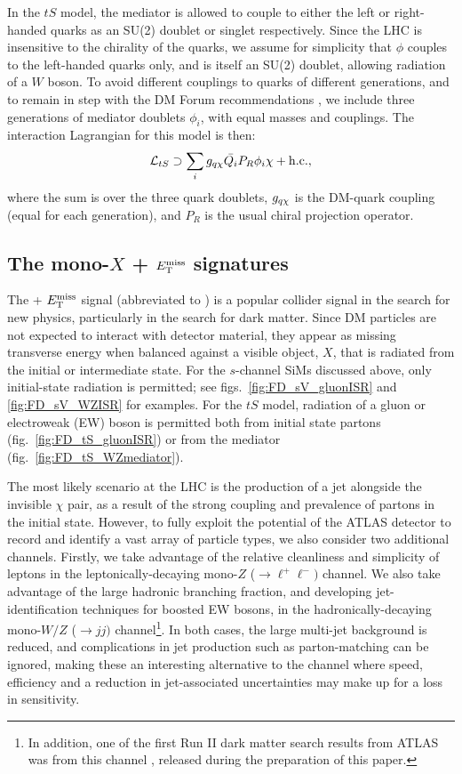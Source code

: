 In the $tS$ model, the mediator is allowed to couple to either the left or right-handed quarks as an SU(2) doublet or singlet respectively. Since the LHC is insensitive to the chirality of the quarks, we assume for simplicity that $\phi$ couples to the left-handed quarks only, and is itself an SU(2) doublet, allowing radiation of a $W$ boson. To avoid different couplings to quarks of different generations, and to remain in step with the DM Forum recommendations \cite{DMForumReport}, we include three generations of mediator doublets $\phi_i$, with equal masses and couplings. The interaction Lagrangian for this model is then:
\begin{equation}
\label{L_int_tS}
\mathcal{L}_{tS} \supset \sum_{i} g_{q \chi} \bar{Q_i} P_R \phi_i \chi + {\rm h.c.},
\end{equation}
where the sum is over the three quark doublets, $g_{q \chi}$ is the DM-quark coupling (equal for each generation), and $P_R$ is the usual chiral projection operator.

\subsection{The mono-$X$ + $E_{\mathrm{T}}^{\mathrm{miss}}$ signatures}
The \monoX + $E_{\mathrm{T}}^{\mathrm{miss}}$ signal (abbreviated to \monoXnospace) is a popular collider signal in the search for new physics, particularly in the search for dark matter. Since DM particles are not expected to interact with detector material, they appear as missing transverse energy when balanced against a visible object, $X$, that is radiated from the initial or intermediate state. For the $s$-channel SiMs discussed above, only initial-state radiation is permitted; see figs.~\ref{fig:FD_sV_gluonISR} and \ref{fig:FD_sV_WZISR} for examples. For the $tS$ model, radiation of a gluon or electroweak (EW) boson is permitted both from initial state partons (fig.~\ref{fig:FD_tS_gluonISR}) or from the mediator (fig.~\ref{fig:FD_tS_WZmediator}).

The most likely scenario at the LHC is the production of a jet alongside the invisible $\chi$ pair, as a result of the strong coupling and prevalence of partons in the initial state. However, to fully exploit the potential of the ATLAS detector to record and identify a vast array of particle types, we also consider two additional channels. Firstly, we take advantage of the relative cleanliness and simplicity of leptons in the leptonically-decaying mono-$Z$ ($\rightarrow \ell^+ \ell^-)$ channel. We also take advantage of the large hadronic branching fraction, and developing jet-identification techniques for boosted EW bosons, in the hadronically-decaying mono-$W/Z$ ($\rightarrow jj)$ channel\footnote{In addition, one of the first Run II dark matter search results from ATLAS was from this channel \cite{monoWZ_run2}, released during the preparation of this paper.}. In both cases, the large multi-jet background is reduced, and complications in jet production such as parton-matching can be ignored, making these an interesting alternative to the \monojet channel where speed, efficiency and a reduction in jet-associated uncertainties may make up for a loss in sensitivity.

